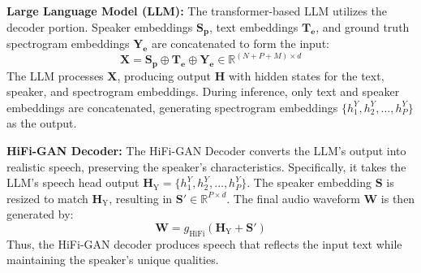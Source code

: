 \noindent \textbf{Large Language Model (LLM):} The transformer-based LLM \cite{radford2019language} utilizes the decoder portion. Speaker embeddings \( \mathbf{S_p} \), text embeddings \( \mathbf{T_e} \), and ground truth spectrogram embeddings \( \mathbf{Y_e} \) are concatenated to form the input:
\[
\mathbf{X} = \mathbf{S_p} \oplus \mathbf{T_e} \oplus \mathbf{Y_e} \in \mathbb{R}^{(N + P + M) \times d}
\]
The LLM processes \( \mathbf{X} \), producing output \( \mathbf{H} \) with hidden states for the text, speaker, and spectrogram embeddings. During inference, only text and speaker embeddings are concatenated, generating spectrogram embeddings \( \{h_1^Y, h_2^Y, \ldots, h_P^Y\} \) as the output.

\noindent \textbf{HiFi-GAN Decoder:} The HiFi-GAN Decoder \cite{kong2020hifi} converts the LLM's output into realistic speech, preserving the speaker's characteristics. Specifically, it takes the LLM's speech head output \( \mathbf{H}_\text{Y} = \{h_1^Y, h_2^Y, \ldots, h_P^Y\} \). The speaker embedding \( \mathbf{S} \) is resized to match \( \mathbf{H}_\text{Y} \), resulting in \( \mathbf{S}' \in \mathbb{R}^{P \times d} \). The final audio waveform \( \mathbf{W} \) is then generated by:
\[
\mathbf{W} = g_\text{HiFi}(\mathbf{H}_\text{Y} + \mathbf{S}')
\]
Thus, the HiFi-GAN decoder produces speech that reflects the input text while maintaining the speaker's unique qualities.
